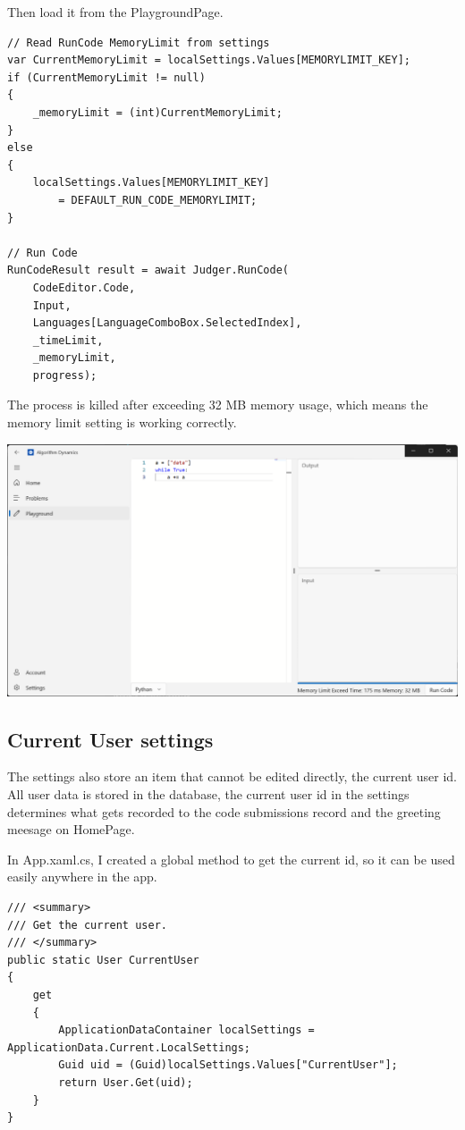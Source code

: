 \documentclass[a4paper]{report}
\begin{document}
Then load it from the PlaygroundPage.

\begin{verbatim}
// Read RunCode MemoryLimit from settings
var CurrentMemoryLimit = localSettings.Values[MEMORYLIMIT_KEY];
if (CurrentMemoryLimit != null)
{
    _memoryLimit = (int)CurrentMemoryLimit;
}
else
{
    localSettings.Values[MEMORYLIMIT_KEY] 
        = DEFAULT_RUN_CODE_MEMORYLIMIT;
}

// Run Code
RunCodeResult result = await Judger.RunCode(
    CodeEditor.Code,
    Input,
    Languages[LanguageComboBox.SelectedIndex],
    _timeLimit,
    _memoryLimit,
    progress);
\end{verbatim}

The process is killed after exceeding 32 MB memory usage, which means the memory limit setting is working correctly.

\includegraphics[width=\textwidth, height=\textheight, keepaspectratio]{PlaygroundPage-RunCodeMemoryLimit}

\subsection{Current User settings}

The settings also store an item that cannot be edited directly, the current user id. All user data is stored in the database, the current user id in the settings determines what gets recorded to the code submissions record and the greeting meesage on HomePage.

In App.xaml.cs, I created a global method to get the current id, so it can be used easily anywhere in the app.

\begin{verbatim}
/// <summary>
/// Get the current user.
/// </summary>
public static User CurrentUser
{
    get
    {
        ApplicationDataContainer localSettings = ApplicationData.Current.LocalSettings;
        Guid uid = (Guid)localSettings.Values["CurrentUser"];
        return User.Get(uid);
    }
}
\end{verbatim}
\end{document}
